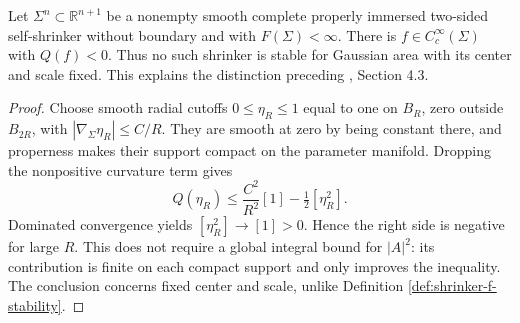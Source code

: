 \begin{theorem}\label{thm:shrinker-fixed-instability}
Let $\Sigma^n\subset\mathbb R^{n+1}$ be a nonempty smooth complete properly immersed two-sided self-shrinker without boundary and with $F(\Sigma)<\infty$. There is $f\in C_c^\infty(\Sigma)$ with $Q(f)<0$. Thus no such shrinker is stable for Gaussian area with its center and scale fixed. This explains the distinction preceding \cite{CM12}, Section 4.3.
\end{theorem}
\begin{proof}
Choose smooth radial cutoffs $0\leq\eta_R\leq1$ equal to one on $B_R$, zero outside $B_{2R}$, with $|\nabla_\Sigma\eta_R|\leq C/R$. They are smooth at zero by being constant there, and properness makes their support compact on the parameter manifold. Dropping the nonpositive curvature term gives
\[
 Q(\eta_R)\leq \frac{C^2}{R^2}[1]-\tfrac12[\eta_R^2].
\]
Dominated convergence yields $[\eta_R^2]\to[1]>0$. Hence the right side is negative for large $R$. This does not require a global integral bound for $|A|^2$: its contribution is finite on each compact support and only improves the inequality. The conclusion concerns fixed center and scale, unlike Definition \ref{def:shrinker-f-stability}.
\end{proof}
